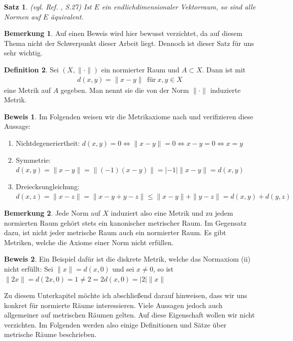 \documentclass[10pt,a4paper]{article}
\theoremstyle{plain}
\newtheorem{satz}{Satz}[section]
\newenvironment{sa}{\begin{shaded}\begin{satz}}{\end{satz}\end{shaded}}
\theoremstyle{definition}
\newtheorem{definition}[satz]{Definition}
\newenvironment{dfi}{\begin{shaded}\begin{definition}}{\end{definition}\end{shaded}}
\theoremstyle{nonumberplain}
\newtheorem{bemerkung}{Bemerkung}
\newenvironment{bem}{\begin{bemerkung}}{\end{bemerkung}}
\newtheorem{beweis}{Beweis}
\newenvironment{bew}{\begin{beweis}}{\end{beweis}}
\begin{document}
\begin{sa}
\label{jede_norm_eq}
(vgl. Ref. \cite{Clason}, S.27) Ist $E$ ein endlichdimensionaler Vektorraum, so sind alle Normen auf $E$ äquivalent.
\end{sa}
\begin{bem}
Auf einen Beweis wird hier bewusst verzichtet, da auf diesem Thema nicht der Schwerpunkt dieser Arbeit liegt. Dennoch ist dieser Satz für uns sehr wichtig.
\end{bem}
\begin{dfi}
Sei $(X, {\|\cdot\|})$ ein normierter Raum und $A \subset X$.
Dann ist mit 
\begin{align*}
d(x, y) = \|x - y\| \enspace \text{für} \: x, y \in X
\end{align*}
eine Metrik auf $A$ gegeben. Man nennt sie die von der Norm $\|\cdot\|$ induzierte Metrik.
\end{dfi}
\begin{bew}
Im Folgenden weisen wir die Metrikaxiome nach und verifizieren diese Aussage:
\begin{enumerate}[label=(\roman*)]
\item Nichtdegeneriertheit: $d(x, y) = 0 \Longleftrightarrow \|x - y\| = 0 \Longleftrightarrow x - y = 0 \Longleftrightarrow x=y$
\item Symmetrie: $d(x, y) = \|x - y\| = \|(-1)(x - y)\| = |-1|\|x - y\| = d(x, y)$
\item Dreiecksungleichung:\\ $d(x, z) =\|x - z\| = \|x - y + y - z\| \leq \|x - y\| + \|y - z\| = d(x, y) + d(y, z)$
\end{enumerate}
\end{bew}
\begin{bem}
Jede Norm auf $X$ induziert also eine Metrik und zu jedem normierten Raum gehört stets ein kanonischer metrischer Raum. Im Gegensatz dazu, ist nicht jeder metrische Raum auch ein normierter Raum. Es gibt Metriken, welche die Axiome einer Norm nicht erfüllen.
\end{bem}
\begin{bew}
Ein Beispiel dafür ist die diskrete Metrik, welche das Normaxiom (ii) nicht erfüllt: 
Sei $\|x\| = d(x,0)$ und sei $x \neq 0$, so ist $\|2x\| = d(2x,0) = 1 \neq 2 = 2d(x,0) = |2|\|x\|$
\end{bew}
\noindent Zu diesem Unterkapitel möchte ich abschließend darauf hinweisen, dass wir uns konkret für normierte Räume interessieren. Viele Aussagen jedoch auch allgemeiner auf metrischen Räumen gelten. Auf diese Eigenschaft wollen wir nicht verzichten. Im Folgenden werden also einige Definitionen und Sätze über metrische Räume beschrieben.
\newpage
\end{document}
